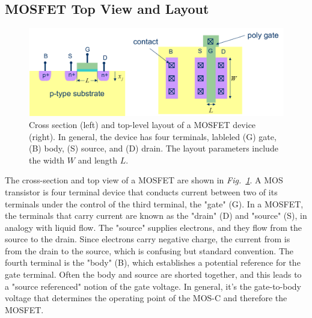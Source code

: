 \subsection{MOSFET Top View and Layout}
\begin{figure}[tb]
\centering
\includegraphics[width=.95\columnwidth]{mosfet_layout}
\caption{Cross section (left) and top-level layout of a MOSFET device (right).  In general, the device has four terminals, lableled (G) gate, (B) body, (S) source, and (D) drain.  The layout parameters include the width $W$ and length $L$.}
\label{fig:mosfet_layout}
\end{figure}
The cross-section and top view of a MOSFET are shown in \emph{Fig.~\ref{fig:mosfet_layout}}.  A MOS transistor is four terminal device that conducts current between two of its terminals under the control of the third terminal, the "gate" (G).  In a MOSFET, the terminals that carry current are known as the "drain" (D) and "source" (S), in analogy with liquid flow.  The "source" supplies electrons, and they flow from the source to the drain.  Since electrons carry negative charge, the current from is from the drain to the source, which is confusing but standard convention.  The fourth terminal is the "body" (B), which establishes a potential reference for the gate terminal.  Often the body and source are shorted together, and this leads to a "source referenced" notion of the gate voltage.  In general, it's the gate-to-body voltage that determines the operating point of the MOS-C and therefore the MOSFET.
